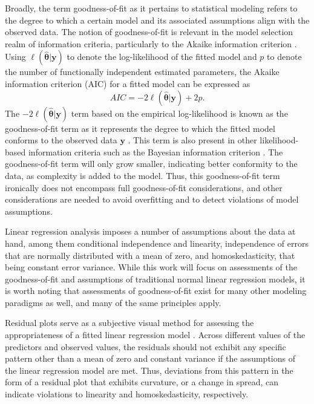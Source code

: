 \documentclass[review]{elsarticle}
\begin{document}
    		Broadly, the term goodness-of-fit as it pertains to statistical modeling refers to the degree to which a certain model
		and its associated assumptions align with the observed data. The notion of goodness-of-fit is relevant in the model selection realm of information criteria, particularly to the Akaike
		information criterion \citep{Akaike}. Using $\ell(\hat{\bm{\theta}}|\bm{y})$ to denote the log-likelihood of the fitted model and $p$ to denote the
		number of functionally independent estimated parameters, the Akaike information criterion (AIC) for a fitted model can be expressed as
		\begin{equation*}
			AIC = -2 \ell(\hat{\bm{\theta}}|\bm{y}) + 2 p.
		\end{equation*}
		The $-2 \ell(\hat{\bm{\theta}}|\bm{y})$ term based on the empirical log-likelihood is known as the goodness-of-fit term as it represents the degree to which the fitted model
		conforms to the observed data $\bm{y}$ \citep{Cavanaugh}. This term is also present in other likelihood-based information criteria such as the Bayesian information criterion \citep{Schwarz}.
		The goodness-of-fit term will only grow smaller, indicating better conformity to the data, as complexity is added to the model. Thus, this goodness-of-fit term ironically does
		not encompass full goodness-of-fit considerations, and other considerations are needed to avoid overfitting and to detect violations of model assumptions.

		Linear regression analysis imposes a number of assumptions about the data at hand, among them conditional independence and linearity, independence of errors that are normally distributed with a mean of zero,
		and homoskedasticity, that being constant error variance. While this work will focus on assessments of the goodness-of-fit and assumptions of traditional normal linear regression models, it is worth noting
		that assessments of goodness-of-fit exist for many other modeling paradigms as well, and many of the same principles apply.
		
		Residual plots serve as a subjective visual method for assessing the appropriateness of a fitted linear regression model \citep{Miles}. Across different values
		of the predictors and observed values, the residuals should not exhibit any specific pattern other than a mean of zero and constant variance if the assumptions of the linear regression model are met.
		Thus, deviations from this pattern in the form of a residual plot that exhibits curvature, or a change in spread, can indicate violations to linearity and homoskedasticity, respectively. 
\end{document}
